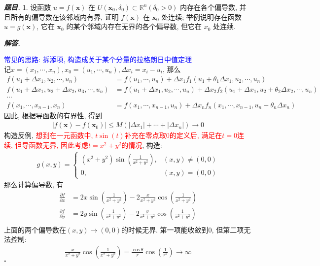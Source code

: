 \documentclass[10pt, a4paper, oneside]{ctexart}
\newenvironment{problem}{\begin{framed}\par\noindent\textbf{\textit{题目. }}}{\end{framed}\par}
\newenvironment{solution}{%
  \par\noindent\textbf{\textit{解答. }}\ignorespaces
}{%
  \hfill\ensuremath{\square}\par %
}
\begin{document}
\begin{problem}
1. 设函数 $u=f(\boldsymbol{x})$ 在 $U\left(\boldsymbol{x}_0, \delta_0\right) \subset \mathbb{R}^n\left(\delta_0>0\right)$ 内存在各个偏导数, 并且所有的偏导数在该邻域内有界, 证明 $f(\boldsymbol{x})$ 在 $\boldsymbol{x}_0$ 处连续; 举例说明存在函数 $u=g(\boldsymbol{x})$, 它在 $\boldsymbol{x}_0$ 的某个邻域内存在无界的各个偏导数, 但它在 $x_0$ 处连续.
\end{problem}
\begin{solution}
\textcolor{blue}{常见的思路: 拆添项, 构造成关于某个分量的拉格朗日中值定理}\\
记$x=(x_1,\cdots,x_n), x_0=(u_1,\cdots,u_n), \Delta x_i=x_i-u_i$, 那么
\begin{align*}
f(u_1+\Delta x_1, u_2,\cdots,u_n)&=f(u_1,\cdots,u_n)+\Delta x_1f_{1}(u_1+\theta_1 \Delta x_1,u_2,\cdots,u_n)\\
f(u_1+\Delta x_1, u_2+\Delta x_2,u_3,\cdots,u_n)&=f(u_1+\Delta x_1,u_2,\cdots,u_n)+\Delta x_2f_{2}(u_1+\Delta x_1,u_2+\theta_2 \Delta x_2,\cdots,u_n)\\
\cdots &\\
f(x_1,\cdots,x_{n-1},x_n)&=f(x_1,\cdots,x_{n-1},u_n)+\Delta x_n f_{n}(x_1,\cdots,x_{n-1},u_n+\theta_n \Delta x_n)
\end{align*}
因此, 根据导函数的有界性, 得到
\begin{align*}
    |f(\bm{x})-f(\bm{x}_0) |\leq M(|\Delta x_1|+\cdots+|\Delta x_n|)\to 0
\end{align*}
构造反例, \textcolor{red}{想到在一元函数中, $t\sin (t)$补充在零点取$0$的定义后, 满足在$t=0$连续, 但导函数无界, 因此考虑$t=x^2+y^2$的情况}, 构造:
\begin{align*}
    g(x,y)=\begin{cases}
        (x^2+y^2)\sin(\frac{1}{x^2+y^2}), & (x,y)\neq (0,0)\\
        0, & (x,y)=(0,0)
    \end{cases}
\end{align*}
那么计算偏导数, 有
\begin{align*}
\frac{\partial f}{\partial x}&=2x\sin(\frac{1}{x^2+y^2})-2\frac{x}{x^2+y^2}\cos(\frac{1}{x^2+y^2})\\
\frac{\partial f}{\partial y}&=2y\sin(\frac{1}{x^2+y^2})-2\frac{y}{x^2+y^2}\cos(\frac{1}{x^2+y^2})\\
\end{align*}
上面的两个偏导数在$(x,y)\to(0,0)$的时候无界. 第一项能收敛到$0$, 但第二项无法控制:
\begin{align*}
    \frac{x}{x^2+y^2}\cos(\frac{1}{x^2+y^2})=\frac{\cos \theta}{r}\cos(\frac{1}{r^2})\to \infty
\end{align*}
\end{solution}
\end{document}
